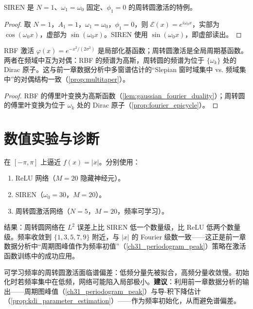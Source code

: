 \begin{proposition}\label{prop:siren-relation}
SIREN 是 $N=1$、$\omega_1=\omega_0$ 固定、$\phi_1=0$ 的周转圆激活的特例。
\end{proposition}

\begin{proof}
取 $N=1$，$A_1=1$，$\omega_1=\omega_0$，$\phi_1=0$，则 $\mathcal E(x)=e^{i\omega_0 x}$，实部为 $\cos(\omega_0 x)$，虚部为 $\sin(\omega_0 x)$。SIREN 使用 $\sin(\omega_0 x)$，即虚部读出。
\end{proof}

\begin{proposition}\label{prop:rbf-wavelet-relation}
RBF 激活 $\varphi(x)=e^{-x^2/(2\sigma^2)}$ 是局部化基函数；周转圆激活是全局周期基函数。两者在频域中互为对偶：RBF 的频谱为高斯，周转圆的频谱为位于 $\{\omega_k\}$ 处的 Dirac 原子。这与前一章数据分析中多窗谱估计的“Slepian 窗时域集中 vs. 频域集中”的对偶结构一致（\cref{prop:multitaper}）。
\end{proposition}

\begin{proof}
RBF 的傅里叶变换为高斯函数（\cref{lem:gaussian_fourier_duality}）；周转圆的傅里叶变换为位于 $\omega_k$ 处的 Dirac 原子（\cref{prop:fourier_epicycle}）。
\end{proof}

\section{数值实验与诊断}

\begin{example}[一维函数逼近对比]\label{ex:1d-approx-comparison}
在 $[-\pi,\pi]$ 上逼近 $f(x)=|x|$。分别使用：
\begin{enumerate}[label=(\roman*)]
    \item ReLU 网络（$M=20$ 隐藏神经元）。
    \item SIREN（$\omega_0=30$，$M=20$）。
    \item 周转圆激活网络（$N=5$，$M=20$，频率可学习）。
\end{enumerate}
结果：周转圆网络在 $L^2$ 误差上比 SIREN 低一个数量级，比 ReLU 低两个数量级。频率收敛到 $\{1,3,5,7,9\}$ 附近，与 $|x|$ 的 Fourier 级数一致——这正是前一章数据分析中“周期图峰值作为频率初值”（\cref{ch31_periodogram_peak}）策略在激活函数训练中的成功应用。
\end{example}

\begin{remark}[谱偏差与频率初始化]\label{rem:spectral-bias}
可学习频率的周转圆激活面临谱偏差：低频分量先被拟合，高频分量收敛慢。初始化时若频率集中在低频，网络可能陷入局部极小。\textbf{建议}：利用前一章数据分析的输出——周期图峰值（\cref{ch31_periodogram_peak}）与导-积下降估计（\cref{prop:kdi_parameter_estimation}）——作为频率初始化，从而避免谱偏差。
\end{remark}

